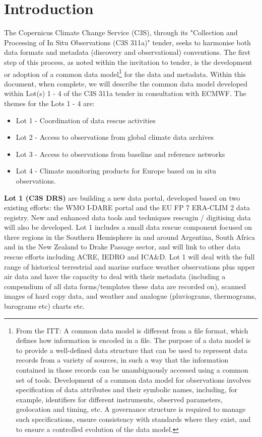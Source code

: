 \documentclass[a4paper]{article}
\begin{document}
\newpage
\tableofcontents
\newpage
\listoftables
\newpage


\section {Introduction}

The Copernicus Climate Change Service (C3S), through its "Collection and Processing of In Situ Observations (C3S 311a)" tender, seeks to harmonise both data formats and metadata (discovery and observational) conventions. The first step of this process, as noted within the invitation to tender, is the development or adoption of a common data model\footnote{From the ITT: A common data model is different from a file format, which defines how information is encoded in a file. The purpose of a data model is to provide a well-defined data structure that can be used to represent data records from a variety of sources, in such a way that the information contained in those records can be unambiguously accessed using a common set of tools. Development of a common data model for observations involves specification of data attributes and their symbolic names, including, for example, identifiers for different instruments, observed parameters, geolocation and timing, etc. A governance structure is required to manage such specifications, ensure consistency with standards where they exist, and to ensure a controlled evolution of the data model.} for the data and metadata. Within this document, when complete, we will describe the common data model developed within Lot(s) 1 - 4 of the C3S 311a tender in consultation with ECMWF. The themes for the Lots 1 - 4 are:\\
\begin{itemize}
\item Lot 1 - Coordination of data rescue activities
\item Lot 2 - Access to observations from global climate data archives
\item Lot 3 - Access to observations from baseline and reference networks
\item Lot 4 - Climate monitoring products for Europe based on in situ observations.
\end{itemize}
\textbf{Lot 1 (C3S DRS)} are building a new data portal, developed based on two existing efforts: the WMO I-DARE portal and the EU FP 7 ERA-CLIM 2 data registry. New and enhanced data tools and techniques rescugin / digitising data will also be developed. Lot 1 includes a small data rescue component focused on three regions in the Southern Hemisphere in and around Argentina, South Africa and in the New Zealand to Drake Passage sector, and will link to other data rescue efforts including ACRE, IEDRO and ICA\&D. Lot 1 will deal with the full range of historical terrestrial and marine surface weather observations plus upper air data and have the capacity to deal with their metadata (including a compendium of all data forms/templates these data are recorded on), scanned images of hard copy data, and weather and analogue (pluviograms, thermograms, barograms etc) charts etc.\\
\end{document}
